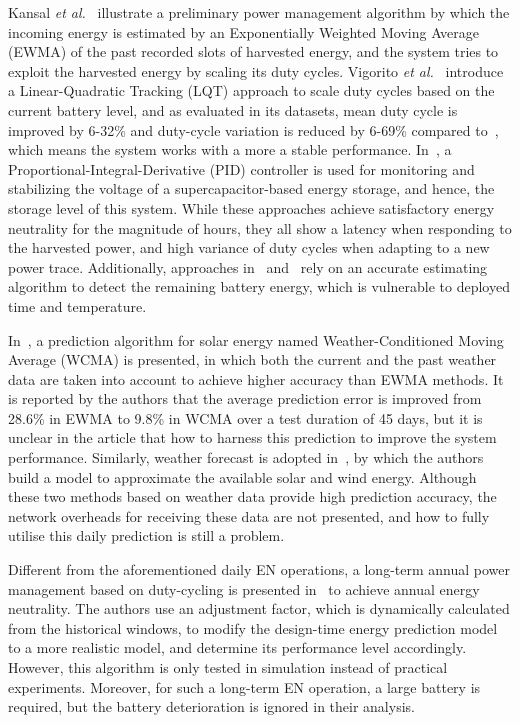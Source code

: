
Kansal \textit{et al.}~\cite{kansal2007power} illustrate a preliminary power management algorithm by which the incoming energy is estimated by an Exponentially Weighted Moving Average (EWMA) of the past recorded slots of harvested energy, and the system tries to exploit the harvested energy by scaling its duty cycles. Vigorito \textit{et al.}~\cite{vigorito2007adaptive} introduce a Linear-Quadratic Tracking (LQT) approach to scale duty cycles based on the current battery level, and as evaluated in its datasets, mean duty cycle is improved by 6-32\% and duty-cycle variation is reduced by 6-69\% compared to~\cite{kansal2007power}, which means the system works with a more a stable performance. In~\cite{le2012power}, a Proportional-Integral-Derivative (PID) controller is used for monitoring and stabilizing the voltage of a supercapacitor-based energy storage, and hence, the storage level of this system. While these approaches achieve satisfactory energy neutrality for the magnitude of hours, they all show a latency when responding to the harvested power, and high variance of duty cycles when adapting to a new power trace. Additionally, approaches in~\cite{vigorito2007adaptive} and~\cite{kansal2007power} rely on an accurate estimating algorithm to detect the remaining battery energy, which is vulnerable to deployed time and temperature. 

In~\cite{piorno2009prediction}, a prediction algorithm for solar energy named Weather-Conditioned Moving Average (WCMA) is presented, in which both the current and the past weather data are taken into account to achieve higher accuracy than EWMA methods. It is reported by the authors that the average prediction error is improved from 28.6\% in EWMA to 9.8\% in WCMA over a test duration of 45 days, but it is unclear in the article that how to harness this prediction to improve the system performance. Similarly, weather forecast is adopted in~\cite{sharma2010cloudy}, by which the authors build a model to approximate the available solar and wind energy. Although these two methods based on weather data provide high prediction accuracy, the network overheads for receiving these data are not presented, and how to fully utilise this daily prediction is still a problem.

Different from the aforementioned daily EN operations, a long-term annual power management based on duty-cycling is presented in~\cite{buchli2014dynamic} to achieve annual energy neutrality. The authors use an adjustment factor, which is dynamically calculated from the historical windows, to modify the design-time energy prediction model to a more realistic model, and determine its performance level accordingly. However, this algorithm is only tested in simulation instead of practical experiments. Moreover, for such a long-term EN operation, a large battery is required, but the battery deterioration is ignored in their analysis.

